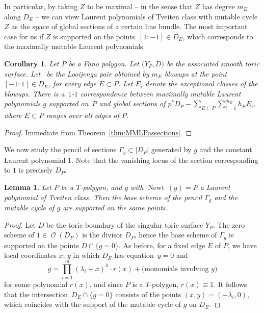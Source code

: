 \documentclass[11pt]{article}
\numberwithin{equation}{section}
\newtheorem{Corollary}[Theorem]{Corollary}
\newtheorem{Lemma}[Theorem]{Lemma}
\DeclareMathOperator{\Newt}{{Newt \,}}
\DeclareMathOperator{\cO}{\mathcal{O}}
\begin{document}
In particular, by taking $Z$ to be maximal -- in the sense that $Z$ has degree $m_E$ along $D_E$ -- we can view Laurent polynomials of Tveiten class with mutable cycle $Z$ as the space of global sections of a certain line bundle. The most important case for us if $Z$ is supported on the points~${[1:-1] \in D_E}$, which corresponds to the maximally mutable Laurent polynomials.
	\begin{Corollary}
		Let $P$ be a Fano polygon. Let $\bigl(\bar{Y}_P, \bar{D}\bigr)$ be the associated smooth toric surface. Let~ be the Looijenga pair obtained by $m_E$ blowups at the point ${[-1:1] \in D_E}$, for every edge $E \subset P$. Let $E_i$ denote the exceptional classes of the blowups. There is a~$1$-$1$ correspondence between maximally mutable Laurent polynomials $g$ supported on~$P$ and global sections of
$p^*D_P-\sum_{E \subset P}\sum_{i=1}^{m_E} h_E E_i$,
		where $E \subset P$ ranges over all edges of $P$.
	\end{Corollary}
\begin{proof}
	Immediate from Theorem~\ref{thm:MMLPassections}.
\end{proof}

We now study the pencil of sections $\Gamma_g \subset |D_P|$ generated by $g$ and the constant Laurent polynomial $1$. Note that the vanishing locus of the section corresponding to $1$ is precisely $D_P$.
\begin{Lemma}\label{lem:baseschemevsmutablecycle}
	Let $P$ be a $T$-polygon, and $g$ with $\Newt(g)=P$ a Laurent polynomial of Tveiten class. Then the base scheme of the pencil $\Gamma_g$ and the mutable cycle of $g$ are supported on the same points.
\end{Lemma}
\begin{proof}
	Let $D$ be the toric boundary of the singular toric surface $Y_P$. The zero scheme of ${1 \in \cO(D_P)}$ is the divisor $D_P$, hence the base scheme of $\Gamma_g$ is supported on the points $D \cap \{g=0\}$. As before, for a fixed edge $E$ of $P$, we have local coordinates $x$, $y$ in which $D_E$ has equation~${y=0}$ and
	\[
	g=\prod_{i=1}^{m} (\lambda_i + x)^{h} \cdot r(x) +\text{(monomials involving $y$)}
	\]
	for some polynomial $r(x)$, and since $P$ is a $T$-polygon, $r(x) \equiv 1$. It follows that the intersection~${D_E \cap \{g=0\}}$ consists of the points $(x, y)=(-\lambda_i, 0)$, which coincides with the support of the mutable cycle of $g$ on $D_E$.
\end{proof}
\end{document}
